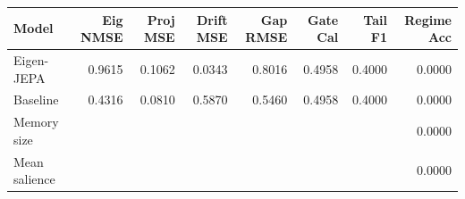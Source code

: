\begin{tabular}{lrrrrrrr}
\toprule
Model & Eig NMSE & Proj MSE & Drift MSE & Gap RMSE & Gate Cal & Tail F1 & Regime Acc \\
\midrule
Eigen-JEPA & 0.9615 & 0.1062 & 0.0343 & 0.8016 & 0.4958 & 0.4000 & 0.0000 \\
Baseline & 0.4316 & 0.0810 & 0.5870 & 0.5460 & 0.4958 & 0.4000 & 0.0000 \\
\midrule
Memory size & \multicolumn{7}{r}{0.0000} \\
Mean salience & \multicolumn{7}{r}{0.0000} \\
\bottomrule
\end{tabular}